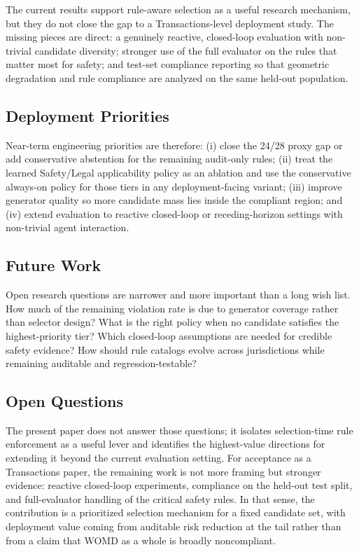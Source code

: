 The current results support rule-aware selection as a useful research mechanism, but they do not close the gap to a Transactions-level deployment study. The missing pieces are direct: a genuinely reactive, closed-loop evaluation with non-trivial candidate diversity; stronger use of the full evaluator on the rules that matter most for safety; and test-set compliance reporting so that geometric degradation and rule compliance are analyzed on the same held-out population.

\subsection{Deployment Priorities}
\label{subsec:limitations}

Near-term engineering priorities are therefore: (i) close the 24/28 proxy gap or add conservative abstention for the remaining audit-only rules; (ii) treat the learned Safety/Legal applicability policy as an ablation and use the conservative always-on policy for those tiers in any deployment-facing variant; (iii) improve generator quality so more candidate mass lies inside the compliant region; and (iv) extend evaluation to reactive closed-loop or receding-horizon settings with non-trivial agent interaction.

\subsection{Future Work}
\label{subsec:future_work}

Open research questions are narrower and more important than a long wish list. How much of the remaining violation rate is due to generator coverage rather than selector design? What is the right policy when no candidate satisfies the highest-priority tier? Which closed-loop assumptions are needed for credible safety evidence? How should rule catalogs evolve across jurisdictions while remaining auditable and regression-testable?

\subsection{Open Questions}
\label{subsec:open_questions}
The present paper does not answer those questions; it isolates selection-time rule enforcement as a useful lever and identifies the highest-value directions for extending it beyond the current evaluation setting. For acceptance as a Transactions paper, the remaining work is not more framing but stronger evidence: reactive closed-loop experiments, compliance on the held-out test split, and full-evaluator handling of the critical safety rules. In that sense, the contribution is a prioritized selection mechanism for a fixed candidate set, with deployment value coming from auditable risk reduction at the tail rather than from a claim that WOMD as a whole is broadly noncompliant.
